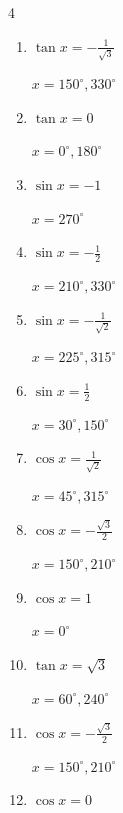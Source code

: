 \begin{multicols}{4}
\begin{enumerate}
        $\displaystyle x = 60^{\circ} , 240^{\circ}$

  \item $\displaystyle \tan{x}  = -\frac{1}{\sqrt{3}}$

        $\displaystyle x = 150^{\circ} , 330^{\circ}$

  \item $\displaystyle \tan{x}  = 0$

        $\displaystyle x = 0^{\circ} , 180^{\circ}$

  \item $\displaystyle \sin{x}  = -1$

        $\displaystyle x = 270^{\circ}$

  \item $\displaystyle \sin{x}  = -\frac{1}{2}$

        $\displaystyle x = 210^{\circ} , 330^{\circ}$

  \item $\displaystyle \sin{x}  = -\frac{1}{\sqrt{2}}$

        $\displaystyle x = 225^{\circ} , 315^{\circ}$

  \item $\displaystyle \sin{x}  = \frac{1}{2}$

        $\displaystyle x = 30^{\circ} , 150^{\circ}$

  \item $\displaystyle \cos{x}  = \frac{1}{\sqrt{2}}$

        $\displaystyle x = 45^{\circ} , 315^{\circ}$

  \item $\displaystyle \cos{x}  = -\frac{\sqrt{3}}{2}$

        $\displaystyle x = 150^{\circ} , 210^{\circ}$

  \item $\displaystyle \cos{x}  = 1$

        $\displaystyle x = 0^{\circ}$

  \item $\displaystyle \tan{x}  = \sqrt{3}$

        $\displaystyle x = 60^{\circ} , 240^{\circ}$

  \item $\displaystyle \cos{x}  = -\frac{\sqrt{3}}{2}$

        $\displaystyle x = 150^{\circ} , 210^{\circ}$

  \item $\displaystyle \cos{x}  = 0$


\end{enumerate}
\end{multicols}
